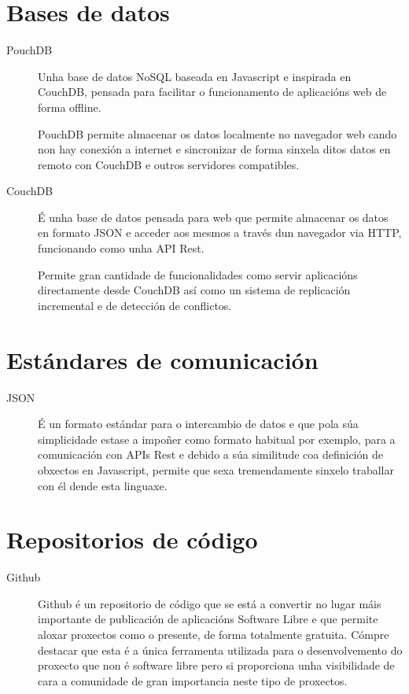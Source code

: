   \section{Bases de datos}

  \begin{description}
     \item [PouchDB] Unha base de datos NoSQL baseada en Javascript e inspirada 
en CouchDB, pensada para facilitar o funcionamento de aplicacións web de forma 
offline.

PouchDB permite almacenar os datos localmente no navegador web cando non 
hay conexión a internet e sincronizar de forma sinxela ditos datos en remoto con 
CouchDB e outros servidores compatibles.

   \item [CouchDB] É unha base de datos pensada para web que permite almacenar 
os datos en formato JSON e acceder aos mesmos a través dun navegador via HTTP, 
funcionando como unha API Rest.

    Permite gran cantidade de funcionalidades como servir aplicacións 
directamente desde CouchDB así como un sistema de replicación incremental e de 
detección de conflictos.

  \end{description}

  \section{Estándares de comunicación}

  \begin{description}
   \item [JSON] É un formato estándar para o intercambio de datos e que pola súa 
simplicidade estase a impoñer como formato habitual por exemplo, para a comunicación con 
APIs Rest e debido a súa similitude coa definición de obxectos en Javascript, permite que 
sexa tremendamente sinxelo traballar con él dende esta linguaxe.
  \end{description}

  \section{Repositorios de código}

  \begin{description}
   \item [Github] Github é un repositorio de código que se está a convertir no lugar máis 
importante de publicación de aplicacións Software Libre e que permite aloxar proxectos 
como o presente, de forma totalmente gratuita.
  Cómpre destacar que esta é a única ferramenta utilizada para o desenvolvemento do 
proxecto que non é software libre pero si proporciona unha visibilidade de cara a 
comunidade de gran importancia neste tipo de proxectos.
  \end{description}

